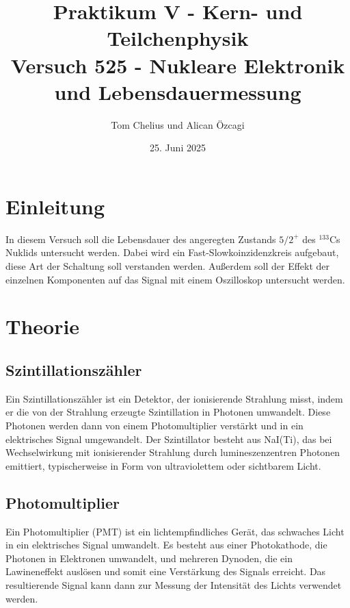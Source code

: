 \documentclass{article}
\title{Praktikum V - Kern- und Teilchenphysik\\Versuch 525 - Nukleare Elektronik und Lebensdauermessung}
\author{Tom Chelius und Alican Özcagi}
\date{25. Juni 2025}
\begin{document}
\maketitle
\newpage
\tableofcontents

\newpage

\section{Einleitung}
In diesem Versuch soll die Lebensdauer des angeregten Zustands $5/2^+$ des $^{133}$Cs Nuklids untersucht werden. Dabei wird ein Fast-Slowkoinzidenzkreis aufgebaut, diese Art der Schaltung soll verstanden werden. 
Außerdem soll der Effekt der einzelnen Komponenten auf das Signal mit einem Oszilloskop untersucht werden. 

\section{Theorie}
\subsection*{Szintillationszähler}
Ein Szintillationszähler ist ein Detektor, der ionisierende Strahlung misst, indem er die von der Strahlung erzeugte Szintillation in Photonen umwandelt.
Diese Photonen werden dann von einem Photomultiplier verstärkt und in ein elektrisches Signal umgewandelt.
Der Szintillator besteht aus NaI(Ti), das bei Wechselwirkung mit ionisierender Strahlung durch lumineszenzentren Photonen emittiert, typischerweise in Form von ultraviolettem oder sichtbarem Licht.
\subsection*{Photomultiplier}
Ein Photomultiplier (PMT) ist ein lichtempfindliches Gerät, das schwaches Licht in ein elektrisches Signal umwandelt. 
Es besteht aus einer Photokathode, die Photonen in Elektronen umwandelt, und mehreren Dynoden, die ein Lawineneffekt auslösen und somit eine Verstärkung des Signals erreicht. 
Das resultierende Signal kann dann zur Messung der Intensität des Lichts verwendet werden.
\end{document}
